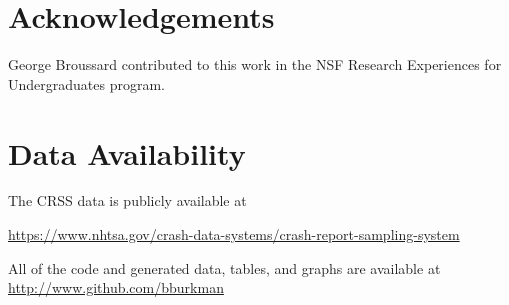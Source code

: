 \documentclass[fleqn]{cas-sc}
\begin{document}
\section*{Acknowledgements}

George Broussard 
contributed to this work in the 
NSF Research Experiences for Undergraduates program.

\section*{Data Availability}

The CRSS data is publicly available at 

\url{https://www.nhtsa.gov/crash-data-systems/crash-report-sampling-system}

All of the code and generated data, tables, and graphs are available at 
\url{http://www.github.com/bburkman}




\begin{comment}
\begin{figure}[<options>]
	\centering
		\texttt{[image: ]}
	  \caption{}\label{fig1}
\end{figure}


\begin{table}[<options>]
\caption{}\label{tbl1}
\begin{tabular*}{\tblwidth}{@{}LL@{}}
\toprule
  &  \\ %
\midrule
 & \\
 & \\
 & \\
 & \\
\bottomrule
\end{tabular*}
\end{table}
\end{comment}


\end{document}
